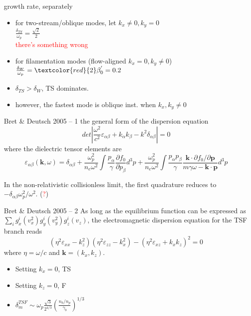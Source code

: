 \documentclass[10pt]{beamer}
\begin{document}
\begin{frame}{growth rate, separately}
    \begin{itemize}
      \item for two-stream/oblique modes, let $k_x \neq 0, k_y = 0$ \\
      $\frac{\delta_{TS}}{\omega_p}=\frac{\sqrt{2}}{2}$ \\
      \textcolor{red}{there's something wrong}
      \item for filamentation modes (flow-aligned $k_x=0, k_y \neq 0$) \\ $\frac{\delta_{W}}{\omega_p}=\textcolor{red}{2}\beta_0^{'}=0.2$
      \item $\delta_{TS} > \delta_{W}$, TS dominates.
      
      \item however, the fastest mode is oblique inst. when $k_x, k_y \neq 0$
  \end{itemize}
\end{frame}

\begin{frame}{Bret \& Deutsch 2005 -- 1}
the general form of the dispersion equation
\begin{equation}
    det \left| \frac{\omega^2}{c^2}\varepsilon_{\alpha \beta} + k_\alpha k_\beta - k^2\delta_{\alpha \beta}\right| = 0
\end{equation}
where the dielectric tensor elements are
\begin{equation}
    \varepsilon_{\alpha \beta}(\bm{k},\omega) = \delta_{\alpha\beta} + \frac{\omega_p^2}{n_e\omega^2} \int \frac{p_\alpha}{\gamma}\frac{\partial f_0}{\partial p_\beta}d^3p + \frac{\omega_p^2}{n_e\omega^2} \int \frac{p_\alpha p_\beta}{\gamma} \frac{\bm{k}\cdot \partial f_0 / \partial \bm{p}}{m\gamma\omega-\bm{k}\cdot\bm{p}}d^3p
\end{equation}

In the non-relativistic collisionless limit, the first quadrature reduces to $-\delta_{\alpha \beta}\omega_p^2/\omega^2$.  (\textcolor{red}{?})
\end{frame}

\begin{frame}{Bret \& Deutsch 2005 -- 2}
As long as the equilibrium function can be expressed as $\sum_i g_x^i(v_x^2) g_y^i(v_y^2) g_z^i(v_z)$, the electromagnetic dispersion equation for the TSF branch reads
\begin{equation}
    (\eta^2\varepsilon_{xx}-k_z^2)(\eta^2\varepsilon_{zz}-k_x^2)-(\eta^2\varepsilon_{xz}+k_xk_z)^2 = 0
\end{equation}
where $\eta = \omega/c$ and $\bm{k}=(k_x,k_z)$.

\begin{itemize}
\item Setting $k_x = 0$, TS
\item Setting $k_z = 0$, F
\item \Large $\delta_m^{TSF} \sim \omega_p\frac{\sqrt{3}}{2^{4/3}}\left(\frac{n_b/n_p}{\gamma_b}\right)^{1/3} $  
\end{itemize}
\end{frame}
\end{document}
